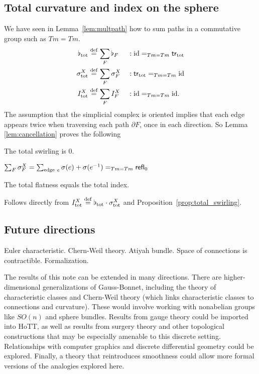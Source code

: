 \subsection{Total curvature and index on the sphere}
We have seen in Lemma~\ref{lem:multpath} how to sum paths in a commutative group such as \( Tm=Tm \).
\begin{equation}
\label{eq:tot_elements}
\begin{aligned}
\flat_{\mathrm{tot}}    & \stackrel{\mathrm{def}}{=} \sum_F\flat_F &&:\text{id}=_{Tm=Tm}\mathsf{tr}_{\mathrm{tot}}\\
\sigma^X_{\mathrm{tot}} & \stackrel{\mathrm{def}}{=} \sum_F\sigma^X_F &&:\mathsf{tr}_{\mathrm{tot}}=_{Tm=Tm}\text{id}\\
I^X_{\mathrm{tot}}      & \stackrel{\mathrm{def}}{=} \sum_F I^X_F &&:\text{id}=_{Tm=Tm}\text{id}.
\end{aligned}
\end{equation}
The assumption that the simplicial complex is oriented implies that each edge appears twice when traversing each path \( \partial F \), once in each direction. So Lemma \ref{lem:cancellation} proves the following
\begin{myprop}The total swirling is 0.\label{prop:total_swirling}
\end{myprop}
\begin{myproof}
\(\sum_F\sigma^X_F=\sum_{\mathrm{edge\ }e}\sigma(e)+\sigma(e^{-1})=_{Tm=Tm}\refl_0\)
\end{myproof}
\begin{mythm}The total flatness equals the total index.
\end{mythm}
\begin{myproof}
Follows directly from \( I^X_{\mathrm{tot}}\stackrel{\mathrm{def}}{=}\flat_{\mathrm{tot}}\cdot \sigma^X_{\mathrm{tot}} \) and Proposition~\ref{prop:total_swirling}.
\end{myproof}


\subsection{Future directions}
Euler characteristic. Chern-Weil theory. Atiyah bundle. Space of connections is contractible. Formalization.

The results of this note can be extended in many directions. There are higher-dimensional generalizations of Gauss-Bonnet, including the theory of characteristic classes and Chern-Weil theory (which links characteristic classes to connections and curvature). These would involve working with nonabelian groups like \( SO(n) \) and sphere bundles. Results from gauge theory could be imported into HoTT, as well as results from surgery theory and other topological constructions that may be especially amenable to this discrete setting. Relationships with computer graphics and discrete differential geometry\cite{crane_ddg}\cite{crane_connections} could be explored. Finally, a theory that reintroduces smoothness could allow more formal versions of the analogies explored here. 
